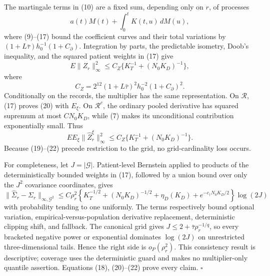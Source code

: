 The martingale terms in (10) are a fixed sum, depending only on \(r\), of processes
\[
 a(t)M(t)+\int_0^tK(t,u)\,dM(u),                         \tag{19}
\]
where (9)--(17) bound the coefficient curves and their total variations by \((1+L\bar\tau)h_0^{-1}(1+C_\partial)\). Integration by parts, the predictable isometry, Doob's inequality, and the squared patient weights in (17) give
\[
 E\|Z_r\|_\infty^2
 \le C_Z\{K_T^{-1}+(N_0K_D)^{-1}\},                    \tag{20}
\]
where
\[
 C_Z=2^{12}(1+L\bar\tau)^2h_0^{-2}(1+C_\partial)^2.     \tag{21}
\]
Conditionally on the records, the multiplier has the same representation. On \(\mathcal R\), (17) proves (20) with \(E_\xi\). On \(\mathcal R^c\), the ordinary pooled derivative has squared supremum at most \(CN_0K_D\), while (7) makes its unconditional contribution exponentially small. Thus
\[
 E E_\xi\|\widehat Z_r^\xi\|_\infty^2
 \le C_Z\{K_T^{-1}+(N_0K_D)^{-1}\}.                    \tag{22}
\]
Because (19)--(22) precede restriction to the grid, no grid-cardinality loss occurs.

For completeness, let \(J=|\mathcal G|\). Patient-level Bernstein applied to products of the deterministically bounded weights in (17), followed by a union bound over only the \(J^2\) covariance coordinates, gives
\[
 \|\widehat\Sigma_r-\Sigma_r\|_{\infty,\mathcal G^2}
 \le C\rho_r^2
 \left\{K_T^{-1/2}+(N_0K_D)^{-1/2}+\eta_D(K_D)
 +e^{-c_\dagger N_0K_D/2}\right\}\log(2J)
\]
with probability tending to one uniformly. The terms respectively bound optional variation, empirical-versus-population derivative replacement, deterministic clipping shift, and fallback. The canonical grid gives \(J\le2+\bar\tau\rho_r^{-1/q}\), so every bracketed negative power or exponential dominates \(\log(2J)\) on unrestricted three-dimensional tails. Hence the right side is \(o_P(\rho_r^2)\). This consistency result is descriptive; coverage uses the deterministic guard and makes no multiplier-only quantile assertion. Equations (18), (20)--(22) prove every claim. \(\square\)